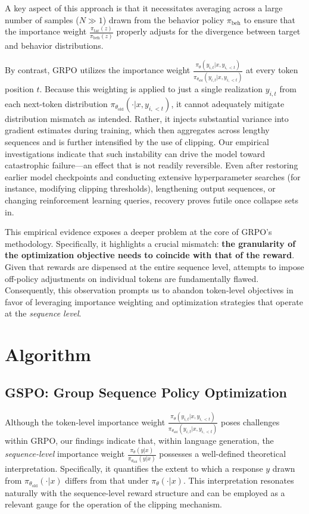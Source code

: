 A key aspect of this approach is that it necessitates averaging across a large number of samples ($N \gg 1$) drawn from the behavior policy $\pi_\text{beh}$ to ensure that the importance weight $\frac{ \pi_\text{tar} (z) }{ \pi_\text{beh} (z)}$ properly adjusts for the divergence between target and behavior distributions.

By contrast, GRPO utilizes the importance weight $\frac{ \pi_{\theta} (y_{i,t} | x, y_{i,<t}) }{ \pi_{\theta_\text{old}} (y_{i,t} | x,y_{i,<t})}$ at every token position $t$. Because this weighting is applied to just a single realization $y_{i,t}$ from each next-token distribution $\pi_{\theta_\text{old}}( \cdot | x, y_{i,<t})$, it cannot adequately mitigate distribution mismatch as intended. Rather, it injects substantial variance into gradient estimates during training, which then aggregates across lengthy sequences and is further intensified by the use of clipping. Our empirical investigations indicate that such instability can drive the model toward catastrophic failure—an effect that is not readily reversible. Even after restoring earlier model checkpoints and conducting extensive hyperparameter searches (for instance, modifying clipping thresholds), lengthening output sequences, or changing reinforcement learning queries, recovery proves futile once collapse sets in.

This empirical evidence exposes a deeper problem at the core of GRPO’s methodology. Specifically, it highlights a crucial mismatch: \textbf{the granularity of the optimization objective needs to coincide with that of the reward}. Given that rewards are dispensed at the entire sequence level, attempts to impose off-policy adjustments on individual tokens are fundamentally flawed. Consequently, this observation prompts us to abandon token-level objectives in favor of leveraging importance weighting and optimization strategies that operate at the \textit{sequence level}.

\section{Algorithm}

\subsection{GSPO: Group Sequence Policy Optimization}

Although the token-level importance weight $\frac{ \pi_{\theta} (y_{i,t} | x, y_{i,<t}) }{ \pi_{\theta_\text{old}} (y_{i,t} | x,y_{i,<t})}$ poses challenges within GRPO, our findings indicate that, within language generation, the \textit{sequence-level} importance weight $\frac{ \pi_{\theta} (y | x) }{ \pi_{\theta_\text{old}} (y | x)}$ possesses a well-defined theoretical interpretation. Specifically, it quantifies the extent to which a response $y$ drawn from $\pi_{\theta_\text{old}} (\cdot | x)$ differs from that under $\pi_{\theta} (\cdot | x)$. This interpretation resonates naturally with the sequence-level reward structure and can be employed as a relevant gauge for the operation of the clipping mechanism.

